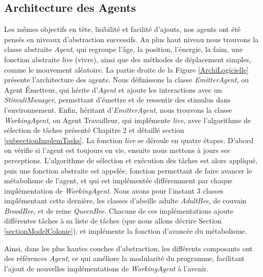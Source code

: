 			\subsection{Architecture des Agents}
			Les mêmes objectifs en tête, lisibilité et facilité d'ajouts, nos agents ont été pensés en niveaux d'abstraction successifs. Au plus haut niveau nous trouvons la classe abstraite \textit{Agent}, qui regroupe l'âge, la position, l'énergie, la faim, une fonction abstraite \textit{live} (vivre), ainsi que des méthodes de déplacement simples, comme le mouvement aléatoire. La partie droite de la Figure \ref{ArchiLogicielle} présente l'architecture des agents. Nous définissons la classe \textit{EmitterAgent}, ou Agent Émetteur, qui hérite d'\textit{Agent} et ajoute les interactions avec un \textit{StimuliManager}, permettant d'émettre et de ressentir des stimulus dans l'environnement. Enfin, héritant d'\textit{EmitterAgent}, nous trouvons la classe \textit{WorkingAgent}, ou Agent Travailleur, qui implémente \textit{live}, avec l'algorithme de sélection de tâches présenté Chapitre 2 et détaillé section \ref{subsectionImplemTasks}. La fonction \textit{live} se déroule en quatre étapes. D'abord on vérifie si l'agent est toujours en vie, ensuite nous mettons à jours ses perceptions. L'algorithme de sélection et exécution des tâches est alors appliqué, puis une fonction abstraite est appelée, fonction permettant de faire avancer le métabolisme de l'agent, et qui est implémentée différemment par chaque implémentation de \textit{WorkingAgent}. Nous avons pour l'instant 3 classes implémentant cette dernière, les classes d'abeille adulte \textit{AdultBee}, de couvain \textit{BroodBee}, et de reine \textit{QueenBee}. Chacune de ces implémentations ajoute différentes tâches à sa liste de tâches (que nous allons décrire Section \ref{sectionModelColonie}), et implémente la fonction d'avancée du métabolisme.
			
			Ainsi, dans les plus hautes couches d'abstraction, les différents composants ont des références \textit{Agent}, ce qui améliore la modularité du programme, facilitant l'ajout de nouvelles implémentations de \textit{WorkingAgent} à l'avenir. 
			
